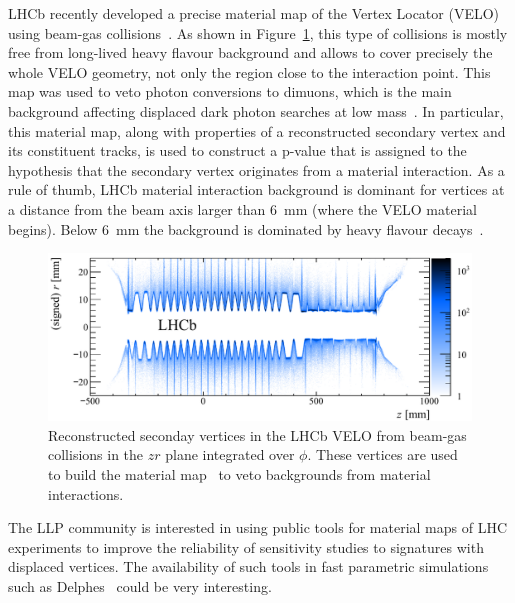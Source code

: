LHCb recently developed a precise material map of the Vertex Locator (VELO) using beam-gas collisions~\cite{Alexander:2018png}. As shown in Figure~\ref{fig:lhcbmaterialmap}, this type of collisions is mostly free from long-lived heavy flavour background and allows to cover precisely the whole VELO geometry, not only the region close to the interaction point. This map was used to veto photon conversions to dimuons, which is the main background affecting displaced dark photon searches at low mass~\cite{Aaij:2017rft}. 
In particular, this material map, along with properties of a reconstructed secondary vertex and its constituent tracks, is used to construct a p-value that is assigned to the hypothesis that the secondary vertex originates from a material interaction. As a rule of thumb, LHCb material interaction background is dominant for vertices at a distance from the beam axis larger than 6~mm (where the VELO material begins). Below 6~mm the background is dominated by heavy flavour decays~\cite{Ilten:2016tkc}.

\begin{figure}[h]
  \centering
  \includegraphics[width=\textwidth]{figures/lhcbmaterial.pdf}
  \caption{Reconstructed seconday vertices in the LHCb VELO from beam-gas collisions in the $zr$ plane integrated over $\phi$. These vertices are used to build the material map~\cite{Alexander:2018png} to veto backgrounds from material interactions.
  }
  \label{fig:lhcbmaterialmap}
\end{figure}


The LLP community is interested in using public tools for material maps of LHC experiments to improve the reliability of sensitivity studies to signatures with displaced vertices. The availability of such tools in fast parametric simulations such as Delphes~\cite{deFavereau:2013fsa} could be very interesting.


